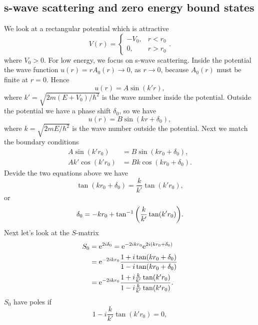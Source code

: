 \documentclass[10pt]{article}
\begin{document}
	\subsection{s-wave scattering and zero energy bound states}
	We look at a rectangular potential which is attractive
	\begin{equation}
		V(r) =
		\begin{cases}
				-V_0,& r<r_0 \\
				0,& r>r_0
		\end{cases}.
	\end{equation}
	where $V_0 >0$. For low energy, we focus on s-wave scattering. Inside the potential the wave function $u(r) = r A_0(r) \to 0$, as $r\to 0$, because $A_0(r)$ must be finite at $r = 0$. Hence
	\begin{equation}
		u(r) = A \sin(k'r),
	\end{equation}
	where $k' = \sqrt{2m(E+V_0)/\hbar^2}$ is the wave number inside the potential. Outside the potential we have a phase shift $\delta_0$, so we have
	\begin{equation}
		u(r) = B \sin(kr + \delta_0),
	\end{equation}
	where $k = \sqrt{2mE/\hbar^2}$ is the wave number outside the potential. Next we match the boundary conditions
	\begin{align*}
		A \sin(k'r_0) &= B \sin(kr_0 + \delta_0), \\
		A k' \cos(k' r_0) &= B k \cos(kr_0 + \delta_0).
	\end{align*}
	Devide the two equations above we have
	\begin{equation}
		\tan(kr_0 + \delta_0) = \frac{k}{k'} \tan(k' r_0),
	\end{equation}
	or
	\begin{equation}
		\delta_0 = -kr_0 + \tan^{-1}\qty(\frac{k}{k'}\tan(k'r_0)).
	\end{equation}
	Next let's look at the $S$-matrix
	\begin{align*}
		S_0 &= {\mathrm{e}}^{2i\delta_0} = {\mathrm{e}}^{-2ikr_0} {\mathrm{e}}^{2i(kr_0 + \delta_0)} \\
		&= {\mathrm{e}}^{-2ikr_0} \frac{1+ i \tan(kr_0 + \delta_0)}{1 - i \tan(k r_0 + \delta_0)} \\
		&= {\mathrm{e}}^{-2ikr_0} \frac{1 + i \frac{k}{k'} \tan(k' r_0)}{1 - i \frac{k}{k'} \tan(k' r_0)}.
	\end{align*}
	$S_0$ have poles if
	\begin{equation}
		1 - i \frac{k}{k'} \tan(k' r_0) = 0, \label{eq: 1.29.1}
	\end{equation}
\end{document}
